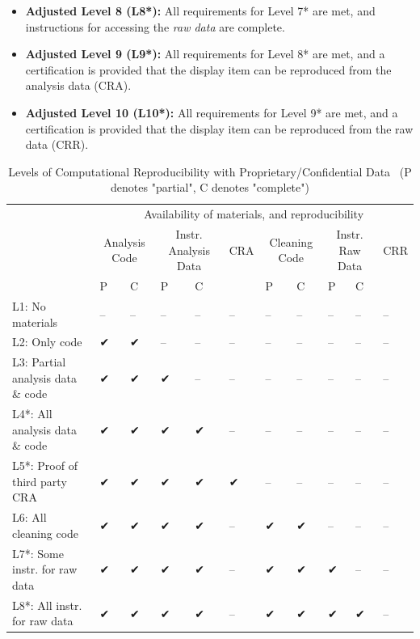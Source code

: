 \documentclass[
]{book}
\begin{document}
\begin{itemize}
\item
  \textbf{Adjusted Level 8 (L8*):} All requirements for Level 7* are met, and instructions for accessing the \emph{raw data} are complete.
\item
  \textbf{Adjusted Level 9 (L9*):} All requirements for Level 8* are met, and a certification is provided that the display item can be reproduced from the analysis data (CRA).
\item
  \textbf{Adjusted Level 10 (L10*):} All requirements for Level 9* are met, and a certification is provided that the display item can be reproduced from the raw data (CRR).
\end{itemize}

\begin{table}

\caption{\label{tab:levels-of-computational-reproducibility-adjusted}Levels of Computational Reproducibility with Proprietary/Confidential Data \
 (P denotes "partial", C denotes "complete")}
\centering
\begin{tabular}[t]{l|l|l|l|l|l|l|l|l|l|l}
\hline
\multicolumn{1}{c|}{ } & \multicolumn{10}{c}{Availability of materials, and reproducibility} \\
\cline{2-11}
\multicolumn{1}{c|}{ } & \multicolumn{2}{c|}{Analysis Code} & \multicolumn{2}{c|}{Instr. Analysis Data} & \multicolumn{1}{c|}{CRA} & \multicolumn{2}{c|}{Cleaning Code} & \multicolumn{2}{c|}{Instr. Raw Data} & \multicolumn{1}{c}{CRR} \\
\cline{2-3} \cline{4-5} \cline{6-6} \cline{7-8} \cline{9-10} \cline{11-11}
  & P & C & P & C &   & P & C & P & C &  \\
\hline
L1: No materials & -- & -- & -- & -- & -- & -- & -- & -- & -- & --\\
\hline
L2: Only code & ✔ & ✔ & -- & -- & -- & -- & -- & -- & -- & --\\
\hline
L3: Partial analysis data \& code & ✔ & ✔ & ✔ & -- & -- & -- & -- & -- & -- & --\\
\hline
L4*: All analysis data \& code & ✔ & ✔ & ✔ & ✔ & -- & -- & -- & -- & -- & --\\
\hline
L5*: Proof of third party CRA & ✔ & ✔ & ✔ & ✔ & ✔ & -- & -- & -- & -- & --\\
\hline
L6: All cleaning code & ✔ & ✔ & ✔ & ✔ & -- & ✔ & ✔ & -- & -- & --\\
\hline
L7*: Some instr. for raw data & ✔ & ✔ & ✔ & ✔ & -- & ✔ & ✔ & ✔ & -- & --\\
\hline
L8*: All instr. for raw data & ✔ & ✔ & ✔ & ✔ & -- & ✔ & ✔ & ✔ & ✔ & --\\

\end{tabular}
\end{table}
\end{document}
